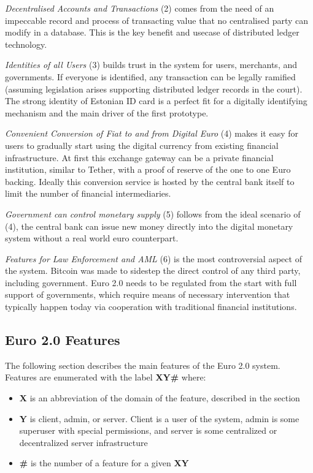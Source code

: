 \documentclass[a4paper,12pt]{article} %
\newcommand{\hypernameref}[1]{\hyperref[#1]{\nameref{#1}}}
\begin{document}
{{\textit{Decentralised Accounts and Transactions} (2) comes from the need of an impeccable record and process of transacting value that no centralised party can modify in a database. This is the key benefit and usecase of distributed ledger technology.

\textit{Identities of all Users} (3) builds trust in the system for users, merchants, and governments. If everyone is identified, any transaction can be legally ramified (assuming legislation arises supporting distributed ledger records in the court). The strong identity of Estonian ID card is a perfect fit for a digitally identifying mechanism and the main driver of the first prototype.

\textit{Convenient Conversion of Fiat to and from Digital Euro} (4) makes it easy for users to gradually start using the digital currency from existing financial infrastructure. At first this exchange gateway can be a private financial institution, similar to Tether\cite{tether}, with a proof of reserve of the one to one Euro backing. Ideally this conversion service is hosted by the central bank itself to limit the number of financial intermediaries.

\textit{Government can control monetary supply} (5) follows from the ideal scenario of (4), the central bank can issue new money directly into the digital monetary system without a real world euro counterpart.

\textit{Features for Law Enforcement and AML} (6) is the most controversial aspect of the system. Bitcoin was made to sidestep the direct control of any third party, including government\cite{nakamoto2008bitcoin}. Euro 2.0 needs to be regulated from the start with full support of governments, which require means of necessary intervention that typically happen today via cooperation with traditional financial institutions.

\subsection{Euro 2.0 Features} \label{ssec:3.3}

The following section describes the main features of the Euro 2.0 system. Features are enumerated with the label \textbf{XY\#} where:
\begin{itemize}
	\item \textbf{X} is an abbreviation of the domain of the feature, described in the \hypernameref{sssec:3.3:domains} section
	\item \textbf{Y} is client, admin, or server. Client is a user of the system, admin is some superuser with special permissions, and server is some centralized or decentralized server infrastructure
	\item \textbf{\#} is the number of a feature for a given \textbf{XY}
\end{itemize}

}}
\end{document}
